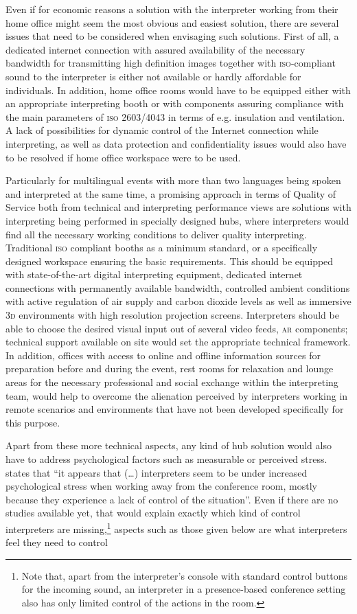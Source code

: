 \documentclass[output=paper]{langsci/langscibook}
\begin{document}
Even if for economic reasons a solution with the interpreter working from their home office might seem the most obvious and easiest solution, there are several issues that need to be considered when envisaging such solutions. First of all, a dedicated internet connection with assured availability of the necessary bandwidth for transmitting high definition images together with \textsc{iso}-compliant sound to the interpreter is either not available or hardly affordable for individuals. In addition, home office rooms would have to be equipped either with an appropriate interpreting booth or with components assuring compliance with the main parameters of \textsc{iso 2603\slash4043} in terms of e.g. insulation and ventilation. A lack of possibilities for dynamic control of the Internet connection while interpreting, as well as data protection and confidentiality issues would also have to be resolved if home office workspace were to be used.

Particularly for multilingual events with more than two languages being spoken and interpreted at the same time, a promising approach in terms of Quality of Service both from technical and interpreting performance views are solutions with interpreting being performed in specially designed hubs, where interpreters would find all the necessary working conditions to deliver quality interpreting. Traditional \textsc{iso} compliant booths as a minimum standard, or a specifically designed workspace ensuring the basic requirements. This should be equipped with state-of-the-art digital interpreting equipment, dedicated internet connections with permanently available bandwidth, controlled ambient conditions with active regulation of air supply and carbon dioxide levels as well as immersive \textsc{3d} environments with high resolution projection screens. Interpreters should be able to choose the desired visual input out of several video feeds, \textsc{ar} components; technical support available on site would set the appropriate technical framework. In addition, offices with access to online and offline information sources for preparation before and during the event, rest rooms for relaxation and lounge areas for the necessary professional and social exchange within the interpreting team, would help to overcome the alienation perceived by interpreters working in remote scenarios and environments that have not been developed specifically for this purpose. 

\largerpage
Apart from these more technical aspects, any kind of hub solution would also have to address psychological factors such as measurable or perceived stress. \citet[15]{Moser-Mercer2005} states that “it appears that (…) interpreters seem to be under increased psychological stress when working away from the conference room, mostly because they experience a lack of control of the situation”. Even if there are no studies available yet, that would explain exactly which kind of control interpreters are missing,\footnote{Note that, apart from the interpreter’s console with standard control buttons for the incoming sound, an interpreter in a presence-based conference setting also has only limited control of the actions in the room.} aspects such as those given below are what interpreters feel they need to control
\end{document}
